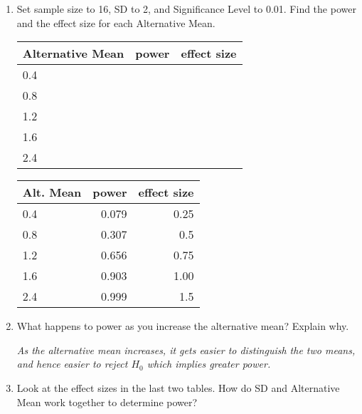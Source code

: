 \begin{enumerate}
  \item  Set sample size to 16, SD to 2, and
    Significance Level to 0.01. Find the power and the effect size for
    each Alternative Mean.\\ 
\begin{students}
  \begin{tabular}{ |l|r|r|}\hline
    Alternative Mean & power& effect size\\ \hline
    {\large 0.4} && \\ \hline
    {\large 0.8} &&\\ \hline
    {\large 1.2} &&\\ \hline
    {\large 1.6} &&\\ \hline
    {\large 2.4} &&\\ \hline
  \end{tabular}
\end{students}

\begin{key}
  \begin{tabular}{ |l|r|r|}\hline
     Alt. Mean & power& effect size\\ \hline
    {\large 0.4} &0.079& 0.25\\ \hline
    {\large 0.8} &0.307&0.5\\ \hline
    {\large 1.2}&0.656 &0.75\\ \hline
    {\large 1.6}&0.903 &1.00\\ \hline
    {\large 2.4}&0.999 &1.5\\ \hline
  \end{tabular}
\end{key}
\item      What happens to power as you increase the alternative mean? Explain why.
\begin{students}
\vspace{2cm} %
\end{students}

\begin{key}
  {\it As the alternative mean increases, it gets easier to
    distinguish the two means, and hence easier to reject $H_0$ which
    implies greater power.  }
\end{key}

\item Look at the effect sizes in the last two tables.
    How do SD and Alternative Mean work together to determine power? 
\begin{students}
 \vspace{2cm}
\end{students}


\end{enumerate}
